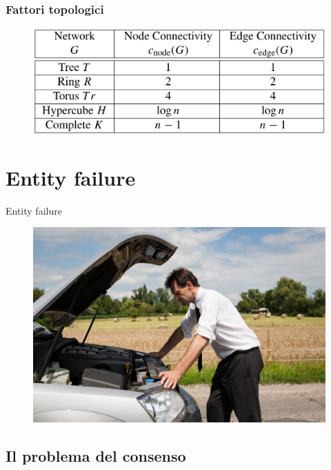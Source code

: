 		\begin{frame}
			\frametitle{Fattori topologici}
			\begin{center}
				\begin{figure}
					\includegraphics[width=\textwidth]{img/connessioni}
				\end{figure}
			\end{center}
		\end{frame}

\section{Entity failure}

	\logo{}

	\begin{frame}
		\begin{center}
			\LARGE{Entity failure}
		\end{center}
		\begin{center}
			\begin{figure}
				\includegraphics[width=.75\textwidth]{img/panne}
			\end{figure}
		\end{center}
	\end{frame}

	\subsection{Il problema del consenso}
	
